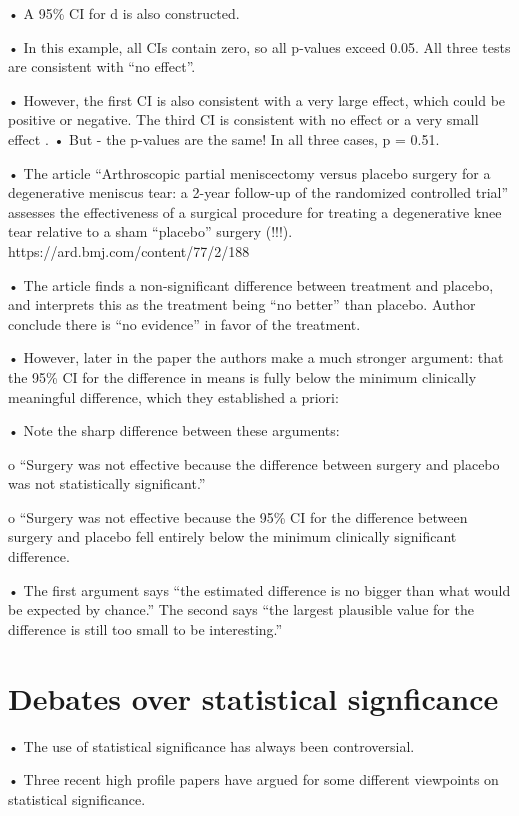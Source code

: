 \documentclass[
  letterpaper,
  DIV=11,
  numbers=noendperiod]{scrreprt}
\begin{document}
• A 95\% CI for d is also constructed.

• In this example, all CIs contain zero, so all p-values exceed 0.05.
All three tests are consistent with ``no effect''.

• However, the first CI is also consistent with a very large effect,
which could be positive or negative. The third CI is consistent with no
effect or a very small effect . • But - the p-values are the same! In
all three cases, p = 0.51.

• The article ``Arthroscopic partial meniscectomy versus placebo surgery
for a degenerative meniscus tear: a 2-year follow-up of the randomized
controlled trial'' assesses the effectiveness of a surgical procedure
for treating a degenerative knee tear relative to a sham ``placebo''
surgery (!!!). https://ard.bmj.com/content/77/2/188

• The article finds a non-significant difference between treatment and
placebo, and interprets this as the treatment being ``no better'' than
placebo. Author conclude there is ``no evidence'' in favor of the
treatment.

• However, later in the paper the authors make a much stronger argument:
that the 95\% CI for the difference in means is fully below the minimum
clinically meaningful difference, which they established a priori:

• Note the sharp difference between these arguments:

o ``Surgery was not effective because the difference between surgery and
placebo was not statistically significant.''

o ``Surgery was not effective because the 95\% CI for the difference
between surgery and placebo fell entirely below the minimum clinically
significant difference.

• The first argument says ``the estimated difference is no bigger than
what would be expected by chance.'' The second says ``the largest
plausible value for the difference is still too small to be
interesting.''

\hypertarget{debates-over-statistical-signficance}{%
\section{Debates over statistical
signficance}\label{debates-over-statistical-signficance}}

• The use of statistical significance has always been controversial.

• Three recent high profile papers have argued for some different
viewpoints on statistical significance.
\end{document}
